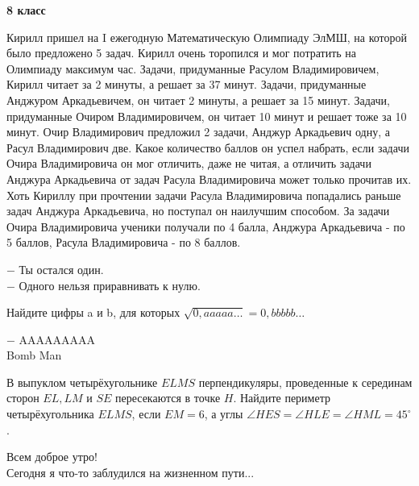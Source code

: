 \hspace{3mm}

\centerline{\bf \huge 8 класс}

\hspace{3mm}

 Кирилл пришел на I ежегодную Математическую Олимпиаду ЭлМШ, на которой было предложено 5 задач. Кирилл очень торопился и мог потратить на Олимпиаду максимум час. Задачи, придуманные Расулом Владимировичем, Кирилл читает за 2 минуты, а решает за 37 минут. Задачи, придуманные Анджуром Аркадьевичем, он читает 2 минуты, а решает за 15 минут. Задачи, придуманные Очиром Владимировичем, он читает 10 минут и решает тоже за 10 минут. Очир Владимирович предложил 2 задачи, Анджур Аркадьевич одну, а Расул Владимирович две. Какое количество баллов он успел набрать, если задачи Очира Владимировича он мог отличить, даже не читая, а отличить задачи Анджура Аркадьевича от задач Расула Владимировича может только прочитав их. Хоть Кириллу при прочтении задачи Расула Владимировича попадались раньше задач Анджура Аркадьевича, но поступал он наилучшим способом. За задачи Очира Владимировича ученики получали по 4 балла, Анджура Аркадьевича - по 5 баллов, Расула Владимировича - по 8 баллов.

\begin{flushright}
    \scriptsize{$-$ Ты остался один. \\
                $-$ Одного нельзя приравнивать к нулю.}
\end{flushright}

\hspace{3mm}

 Найдите цифры a и b, для которых $\sqrt{0,aaaaa\dotsc} = 0,bbbbb \dotsc$

\begin{flushright}
    \scriptsize{$-$ AAAAAAAAA \\
                Bomb Man}
\end{flushright}

\hspace{3mm}

 В выпуклом четырёхугольнике $ELMS$ перпендикуляры, проведенные к серединам сторон $EL, LM$ и $SE$ пересекаются в точке $H$. Найдите периметр четырёхугольника $ELMS$, если $EM = 6$, а углы $\angle HES=\angle HLE=\angle HML=45^{\circ}$.

\begin{flushright}
    \scriptsize{Всем доброе утро!\\ Сегодня я что-то заблудился на жизненном пути...}
\end{flushright}



